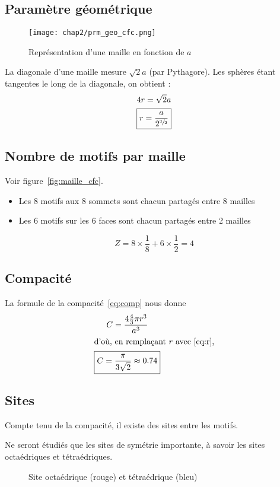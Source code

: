 \subsection{Paramètre géométrique}
\begin{figure}
    \centering
    \texttt{[image: chap2/prm\_geo\_cfc.png]}
    \caption{Représentation d'une maille en fonction de $a$}\label{fig:prm_geo_cfc}
\end{figure}

La diagonale d'une maille mesure $\sqrt{2}a$ (par Pythagore).
Les sphères étant tangentes le long de la diagonale, on obtient :
\begin{gather}
    4r = \sqrt{2}a \\
    \boxed{r = \frac{a}{2^{\sfrac{3}{2}}}} \label{eq:r}
\end{gather}
\subsection{Nombre de motifs par maille}
Voir figure~\ref{fig:maille_cfc}.
\begin{itemize}
    \item Les 8 motifs aux 8 sommets sont chacun partagés
        entre 8 mailles
    \item Les 6 motifs sur les 6 faces sont chacun partagés
        entre 2 mailles
\end{itemize}
\begin{equation}
    Z = 8 \times \frac{1}{8} + 6 \times \frac{1}{2} = 4
\end{equation}
\subsection{Compacité}
La formule de la compacité~\ref{eq:comp} nous donne
\begin{gather}
    C = \frac{4 \frac{4}{3} \pi r^3}{a^3}\\
    \intertext{d'où, en remplaçant $r$ avec~\ref{eq:r},}
    \boxed{C = \frac{\pi}{3\sqrt{2}} \approx 0.74}
\end{gather}

\subsection{Sites}
Compte tenu de la compacité, il existe des sites entre les motifs.
\begin{rem}
    Ne seront étudiés que les sites de symétrie importante,
    à savoir les sites octaédriques et tétraédriques.
\end{rem}
\begin{figure}
    \centering
    
    \caption[Sites d'une structure cfc]
    {Site octaédrique (rouge) et tétraédrique (bleu)}\label{fig:2_cfc_sites}
\end{figure}
